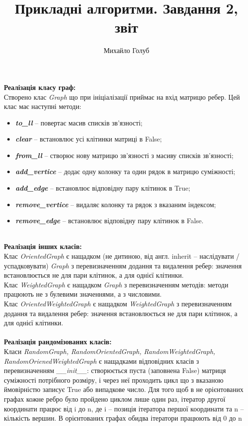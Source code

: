 \documentclass{article}
\title{Прикладні алгоритми. Завдання 2, звіт}
\author{Михайло Голуб}
\begin{document}
\maketitle
\newpage

\textbf{Реалізація класу граф:}
\\\indent
Створено клас \textit{Graph} що при ініціалізації приймає на вхід матрицю ребер. Цей клас має наступні методи:
\begin{itemize}
\item[] \textbf{\textit{to\_ll}} -- повертає масив списків зв'язності;
\item[] \textbf{\textit{clear}} -- встановлює усі клітинки матриці в False;
\item[] \textbf{\textit{from\_ll}} -- створює нову матрицю зв'язності з масиву списків зв'язності;
\item[] \textbf{\textit{add\_vertice}} -- додає одну колонку та один рядок в матрицю суміжності;
\item[] \textbf{\textit{add\_edge}} -- встановлює відповідну пару клітинок в True;
\item[] \textbf{\textit{remove\_vertice}} -- видаляє колонку та рядок з вказаним індексом;
\item[] \textbf{\textit{remove\_edge}} -- встановлює відповідну пару клітинок в False.\\\\
\end{itemize}

\textbf{Реалізація інших класів:}\\\indent
Клас \textit{OrientedGraph} є нащадком (не дитиною, від англ. inherit -- наслідувати / успадковувати) \textit{Graph} з перевизначенням додання та видалення ребер: значення встановлюється не для пари клітинок, а для однієї клітинки.\\\indent
Клас \textit{WeightedGraph} є нащадком \textit{Graph} з перевизначенням методів: методи працюють не з булевими значеннями, а з числовими.\\\indent
Клас \textit{OrientedWeightedGraph} є нащадком \textit{WeightedGraph} з перевизначенням додання та видалення ребер: значення встановлюється не для пари клітинок, а для однієї клітинки.\\\\\indent
\textbf{Реалізація рандомізованих класів:}\\\indent
Класи \textit{RandomGraph, RandomOrientedGraph, RandomWeightedGraph, RandomOrienedWeightedGraph} є нащадками відповідних класів з перевизначенням \textit{\_\_init\_\_}: створюється пуста (заповнена False) матриця суміжності потрібного розміру, і через неї проходить цикл що з вказаною ймовірністю записує True або випадкове число. Для того щоб в не орієнтованих графах кожне ребро було пройдено циклом лише один раз, ітератор другої координати працює від i до n, де i -- позиція ітератора першої координати та n -- кількість вершин. В орієнтованих графах обидва ітератори працюють від 0 до n
\end{document}
